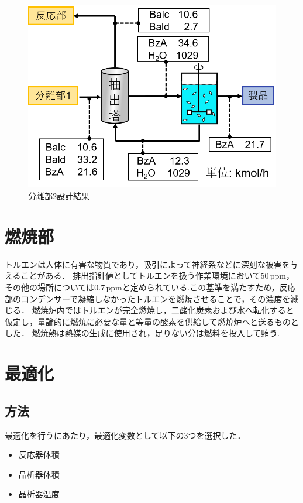\documentclass[a4j]{jsreport}
\begin{document}
\begin{figure}[htbp]
  \centering
  \includegraphics[scale=0.7]{Separion2Conclusion.png}
  \caption{分離部2設計結果}
  \label{分離部2設計結果}
\end{figure}


\clearpage
\chapter{燃焼部}
トルエンは人体に有害な物質であり，吸引によって神経系などに深刻な被害を与えることがある．
排出指針値としてトルエンを扱う作業環境において50\,ppm，その他の場所については0.7\,ppmと定められている\cite{トルエン排出基準}.この基準を満たすため，反応部のコンデンサーで凝縮しなかったトルエンを燃焼させることで，その濃度を減じる．
燃焼炉内ではトルエンが完全燃焼し，二酸化炭素および水へ転化すると仮定し，量論的に燃焼に必要な量と等量の酸素を供給して燃焼炉へと送るものとした．
燃焼熱は熱媒の生成に使用され，足りない分は燃料を投入して賄う.

\clearpage
\chapter{最適化}
\section{方法}
最適化を行うにあたり，最適化変数として以下の3つを選択した．
\begin{itemize}
  \item 反応器体積
  \item 晶析器体積
  \item 晶析器温度
\end{itemize}
\end{document}
